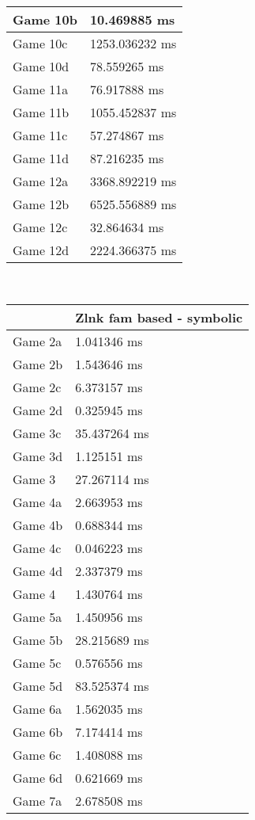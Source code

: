 \begin{multicols}{2}
\begin{tabular}{|l|l|}
	Game 10b & 10.469885 ms \\ \hline
	Game 10c & 1253.036232 ms \\ \hline
	Game 10d & 78.559265 ms \\ \hline
	Game 11a & 76.917888 ms \\ \hline
	Game 11b & 1055.452837 ms \\ \hline
	Game 11c & 57.274867 ms \\ \hline
	Game 11d & 87.216235 ms \\ \hline
	Game 12a & 3368.892219 ms \\ \hline
	Game 12b & 6525.556889 ms \\ \hline
	Game 12c & 32.864634 ms \\ \hline
	Game 12d & 2224.366375 ms \\ \hline
\end{tabular}\\
\begin{tabular}{|l|l|}
	\hline
	& Zlnk fam based - symbolic \\ \hline
	Game 2a & 1.041346 ms \\ \hline
	Game 2b & 1.543646 ms \\ \hline
	Game 2c & 6.373157 ms \\ \hline
	Game 2d & 0.325945 ms \\ \hline
	Game 3c & 35.437264 ms \\ \hline
	Game 3d & 1.125151 ms \\ \hline
	Game 3 & 27.267114 ms \\ \hline
	Game 4a & 2.663953 ms \\ \hline
	Game 4b & 0.688344 ms \\ \hline
	Game 4c & 0.046223 ms \\ \hline
	Game 4d & 2.337379 ms \\ \hline
	Game 4 & 1.430764 ms \\ \hline
	Game 5a & 1.450956 ms \\ \hline
	Game 5b & 28.215689 ms \\ \hline
	Game 5c & 0.576556 ms \\ \hline
	Game 5d & 83.525374 ms \\ \hline
	Game 6a & 1.562035 ms \\ \hline
	Game 6b & 7.174414 ms \\ \hline
	Game 6c & 1.408088 ms \\ \hline
	Game 6d & 0.621669 ms \\ \hline
	Game 7a & 2.678508 ms \\ \hline

\end{tabular}
\end{multicols}
